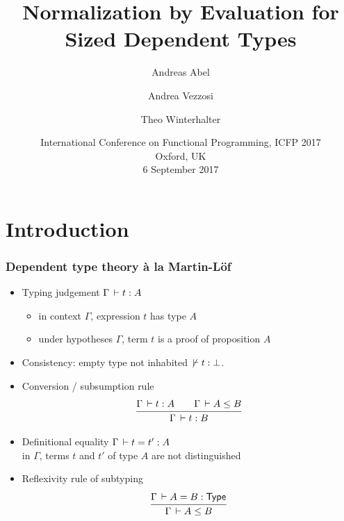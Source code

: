 \documentclass[t,fleqn]{beamer}
\title[NbE for Sized Dependent Types]{%
  Normalization by Evaluation for Sized Dependent Types}
\author[Abel Vezzosi Winterhalter]{
  Andreas Abel\inst{1}
  \and Andrea Vezzosi\inst{1}
  \and Theo Winterhalter\inst{2}
}
\institute[] %
{
  \inst{1}
  Department of Computer Science and Engineering\\
  Chalmers and Gothenburg University, Sweden \\[1ex]

  \inst{2}
  École Normale Supérieure de Cachan, France \\
}
\date[ICFP'17] %
{ International Conference on
  Functional Programming, ICFP 2017 \\
  Oxford, UK \\
6 September 2017
}
\makeatletter
\renewcommand{\ru}[2]{\dfrac{\begin{array}[b]{@{}c@{}} #1 \end{array}}{\begin{array}[t]{@{}l@{}} #2 \end{array}}}
\def\MLine#1{\par\vspace{1ex}\hspace*{-\@totalleftmargin}\parbox{\textwidth}{\[#1\]}}
\newcommand{\cAnn}{\color{red!80!black}}%
\renewcommand{\emph}[1]{{\cAnn#1}}
\newcommand{\cType}{\color{orange!60!black}}
\makeatother
\begin{document}
\maketitle


%
%
%
%

\renewcommand{\emph}[1]{\textit{\cType#1}}

\section{Introduction}



\begin{frame}%
  \frametitle{Dependent type theory \`a la Martin-Löf}
  \begin{itemize}
  \item Typing judgement $\Gamma \,\vdash t : A$
    \begin{itemize}
    \item in context $\Gamma$, expression $t$ has type $A$
    \item under hypotheses $\Gamma$, term $t$ is a proof of
      proposition $A$
    \end{itemize}
  \item Consistency: empty type not inhabited $\not\,\vdash t : \bot$.
  \item Conversion / subsumption rule
    \[
      \ru{\Gamma \der t : A \qquad \Gamma \der A \leq B
        }{\Gamma \der t : B}
    \]
    \vspace{-2ex}
  \item Definitional equality $\Gamma \,\vdash t = t' : A$ \\
     in $\Gamma$, terms $t$ and $t'$ of type $A$ are not distinguished
  \item Reflexivity rule of subtyping
\[
      \ru{\Gamma \der A = B : \Type
        }{\Gamma \der A \leq B}
\]
  \end{itemize}
\end{frame}
\end{document}
